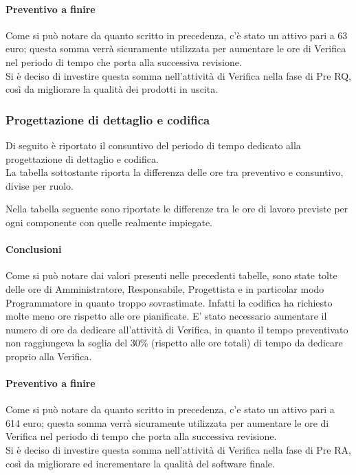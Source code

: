 \paragraph{Preventivo a finire}
Come si può notare da quanto scritto in precedenza, c'è stato un attivo pari a 63 euro; questa somma verrà sicuramente utilizzata per aumentare le ore di Verifica nel periodo di tempo che porta alla successiva revisione.\\
Si è deciso di investire questa somma nell'attività di Verifica nella fase di Pre RQ, così da migliorare la qualità dei prodotti in uscita.

\subsubsection{Progettazione di dettaglio e codifica}
Di seguito è riportato il consuntivo del periodo di tempo dedicato alla progettazione di dettaglio e codifica.\\
La tabella sottostante riporta la differenza delle ore tra preventivo e consuntivo, divise per ruolo.


Nella tabella seguente sono riportate le differenze tra le ore di lavoro previste per ogni componente con quelle realmente impiegate.


\paragraph{Conclusioni}
Come si può notare dai valori presenti nelle precedenti tabelle, sono state tolte delle ore di Amministratore, Responsabile, Progettista e in particolar modo Programmatore in quanto troppo sovrastimate.
Infatti la codifica ha richiesto molte meno ore rispetto alle ore pianificate.
E' stato necessario aumentare il numero di ore da dedicare all'attività di Verifica, in quanto il
tempo preventivato non raggiungeva la soglia del 30\% (rispetto alle ore totali) di tempo da dedicare
proprio alla Verifica.
\paragraph{Preventivo a finire}
Come si può notare da quanto scritto in precedenza, c'e stato un attivo pari a 614 euro; questa somma verrà sicuramente utilizzata per aumentare le ore di Verifica nel periodo di tempo che porta alla successiva revisione.\\
Si è deciso di investire questa somma nell'attività di Verifica nella fase di Pre RA, così da migliorare
ed incrementare la qualità del software finale.

